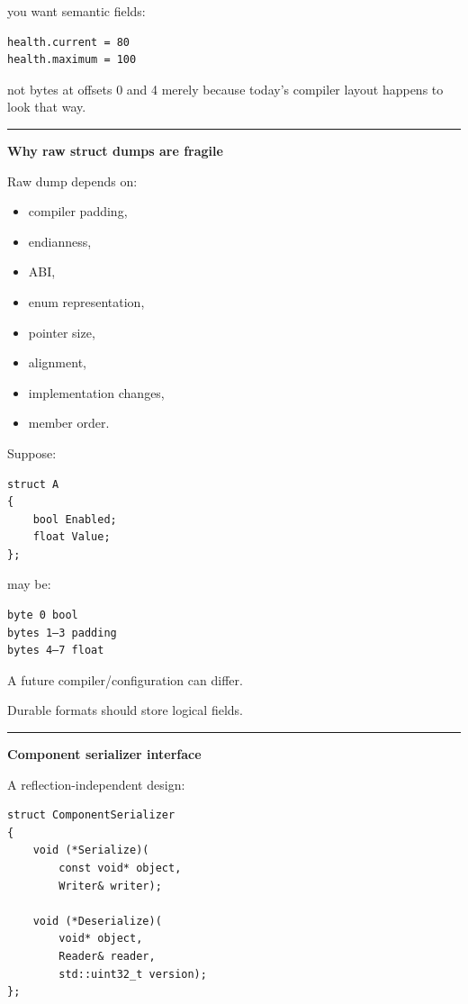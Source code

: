 you want semantic fields:

\begin{verbatim}
health.current = 80
health.maximum = 100
\end{verbatim}

not bytes at offsets 0 and 4 merely because today's compiler layout happens to look that way.

\begin{center}\rule{0.5\linewidth}{0.5pt}\end{center}

\textbf{Why raw struct dumps are fragile}

Raw dump depends on:

\begin{itemize}
\tightlist
\item
  compiler padding,
\item
  endianness,
\item
  ABI,
\item
  enum representation,
\item
  pointer size,
\item
  alignment,
\item
  implementation changes,
\item
  member order.
\end{itemize}

Suppose:

\begin{verbatim}
struct A
{
    bool Enabled;
    float Value;
};
\end{verbatim}

may be:

\begin{verbatim}
byte 0 bool
bytes 1–3 padding
bytes 4–7 float
\end{verbatim}

A future compiler/configuration can differ.

Durable formats should store logical fields.

\begin{center}\rule{0.5\linewidth}{0.5pt}\end{center}

\textbf{Component serializer interface}

A reflection-independent design:

\begin{verbatim}
struct ComponentSerializer
{
    void (*Serialize)(
        const void* object,
        Writer& writer);

    void (*Deserialize)(
        void* object,
        Reader& reader,
        std::uint32_t version);
};
\end{verbatim}

